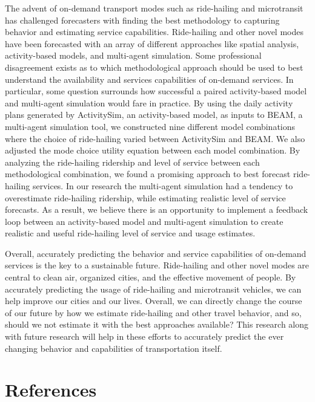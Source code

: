 \documentclass[fancy, masters]{byuthesis}
\begin{document}
The advent of on-demand transport modes such as ride-hailing and microtransit has challenged forecasters with finding the best methodology to capturing behavior and estimating service capabilities. Ride-hailing and other novel modes have been forecasted with an array of different approaches like spatial analysis, activity-based models, and multi-agent simulation. Some professional disagreement exists as to which methodological approach should be used to best understand the availability and services capabilities of on-demand services. In particular, some question surrounds how successful a paired activity-based model and multi-agent simulation would fare in practice. By using the daily activity plans generated by ActivitySim, an activity-based model, as inputs to BEAM, a multi-agent simulation tool, we constructed nine different model combinations where the choice of ride-hailing varied between ActivitySim and BEAM. We also adjusted the mode choice utility equation between each model combination. By analyzing the ride-hailing ridership and level of service between each methodological combination, we found a promising approach to best forecast ride-hailing services. In our research the multi-agent simulation had a tendency to overestimate ride-hailing ridership, while estimating realistic level of service forecasts. As a result, we believe there is an opportunity to implement a feedback loop between an activity-based model and multi-agent simulation to create realistic and useful ride-hailing level of service and usage estimates.

Overall, accurately predicting the behavior and service capabilities of on-demand services is the key to a sustainable future. Ride-hailing and other novel modes are central to clean air, organized cities, and the effective movement of people. By accurately predicting the usage of ride-hailing and microtransit vehicles, we can help improve our cities and our lives. Overall, we can directly change the course of our future by how we estimate ride-hailing and other travel behavior, and so, should we not estimate it with the best approaches available? This research along with future research will help in these efforts to accurately predict the ever changing behavior and capabilities of transportation itself.

\hypertarget{references}{%
\chapter*{References}\label{references}}
\end{document}
